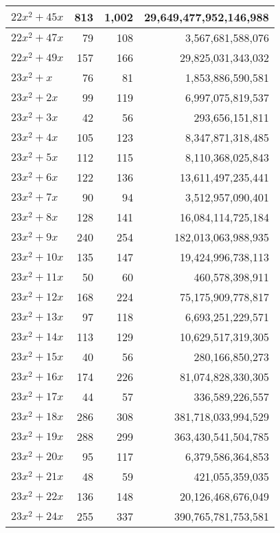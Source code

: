 \documentclass[a4paper]{amsproc}
\theoremstyle{plain}
\theoremstyle{named}
\begin{document}
\begin{longtable}{ | l | r | r | r | }
$22x^2 + 45x$ & 813 & 1{,}002 & 29{,}649{,}477{,}952{,}146{,}988 \\ \hline
$22x^2 + 47x$ & 79 & 108 & 3{,}567{,}681{,}588{,}076 \\ \hline
$22x^2 + 49x$ & 157 & 166 & 29{,}825{,}031{,}343{,}032 \\ \hline
$23x^2 + x$ & 76 & 81 & 1{,}853{,}886{,}590{,}581 \\ \hline
$23x^2 + 2x$ & 99 & 119 & 6{,}997{,}075{,}819{,}537 \\ \hline
$23x^2 + 3x$ & 42 & 56 & 293{,}656{,}151{,}811 \\ \hline
$23x^2 + 4x$ & 105 & 123 & 8{,}347{,}871{,}318{,}485 \\ \hline
$23x^2 + 5x$ & 112 & 115 & 8{,}110{,}368{,}025{,}843 \\ \hline
$23x^2 + 6x$ & 122 & 136 & 13{,}611{,}497{,}235{,}441 \\ \hline
$23x^2 + 7x$ & 90 & 94 & 3{,}512{,}957{,}090{,}401 \\ \hline
$23x^2 + 8x$ & 128 & 141 & 16{,}084{,}114{,}725{,}184 \\ \hline
$23x^2 + 9x$ & 240 & 254 & 182{,}013{,}063{,}988{,}935 \\ \hline
$23x^2 + 10x$ & 135 & 147 & 19{,}424{,}996{,}738{,}113 \\ \hline
$23x^2 + 11x$ & 50 & 60 & 460{,}578{,}398{,}911 \\ \hline
$23x^2 + 12x$ & 168 & 224 & 75{,}175{,}909{,}778{,}817 \\ \hline
$23x^2 + 13x$ & 97 & 118 & 6{,}693{,}251{,}229{,}571 \\ \hline
$23x^2 + 14x$ & 113 & 129 & 10{,}629{,}517{,}319{,}305 \\ \hline
$23x^2 + 15x$ & 40 & 56 & 280{,}166{,}850{,}273 \\ \hline
$23x^2 + 16x$ & 174 & 226 & 81{,}074{,}828{,}330{,}305 \\ \hline
$23x^2 + 17x$ & 44 & 57 & 336{,}589{,}226{,}557 \\ \hline
$23x^2 + 18x$ & 286 & 308 & 381{,}718{,}033{,}994{,}529 \\ \hline
$23x^2 + 19x$ & 288 & 299 & 363{,}430{,}541{,}504{,}785 \\ \hline
$23x^2 + 20x$ & 95 & 117 & 6{,}379{,}586{,}364{,}853 \\ \hline
$23x^2 + 21x$ & 48 & 59 & 421{,}055{,}359{,}035 \\ \hline
$23x^2 + 22x$ & 136 & 148 & 20{,}126{,}468{,}676{,}049 \\ \hline
$23x^2 + 24x$ & 255 & 337 & 390{,}765{,}781{,}753{,}581 \\ \hline

\end{longtable}
\end{document}
